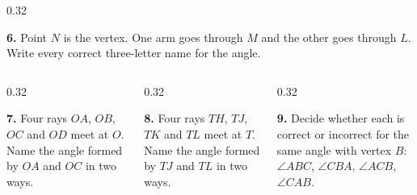 \documentclass[aspectratio=169,12pt]{beamer}
\newcommand{\MMProblem}[2]{\begin{MMProblemCard}\raggedright\small\textbf{#1.} #2\par\end{MMProblemCard}}
\begin{document}
\begin{frame}[t]
\begin{columns}[T,onlytextwidth]
\begin{column}{0.32\textwidth}\MMProblem{6}{Point \mbox{$N$} is the vertex. One arm goes through \mbox{$M$} and the other goes through \mbox{$L$}. Write every correct three-letter name for the angle.}\end{column}
\end{columns}
\vspace{0.45em}
\begin{columns}[T,onlytextwidth]
\begin{column}{0.32\textwidth}\MMProblem{7}{Four rays \mbox{$OA$}, \mbox{$OB$}, \mbox{$OC$} and \mbox{$OD$} meet at \mbox{$O$}. Name the angle formed by \mbox{$OA$} and \mbox{$OC$} in two ways.}\end{column}
\begin{column}{0.32\textwidth}\MMProblem{8}{Four rays \mbox{$TH$}, \mbox{$TJ$}, \mbox{$TK$} and \mbox{$TL$} meet at \mbox{$T$}. Name the angle formed by \mbox{$TJ$} and \mbox{$TL$} in two ways.}\end{column}
\begin{column}{0.32\textwidth}\MMProblem{9}{Decide whether each is correct or incorrect for the same angle with vertex \mbox{$B$}: \mbox{$\angle ABC$}, \mbox{$\angle CBA$}, \mbox{$\angle ACB$}, \mbox{$\angle CAB$}.}\end{column}
\end{columns}
\end{frame}
\end{document}
